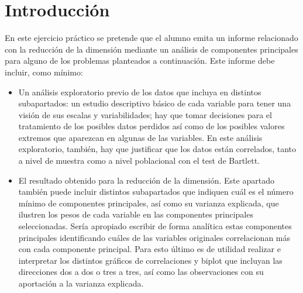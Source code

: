 \documentclass[12pt,twoside]{report}
\date{Curso 2020-2021}
\begin{document}



\clearpage{\pagestyle{empty}\cleardoublepage}
\setcounter{page}{1}
\pagestyle{fancy}



\begingroup
\pagestyle{plain}
\tableofcontents 
\endgroup

\clearpage{\pagestyle{empty}\cleardoublepage}
\setcounter{page}{1}
\fancyhead[LE,RO]{\slshape \rightmark}
\fancyhead[LO,RE]{\slshape \leftmark}

\chapter*{Introducción}

En este ejercicio práctico se pretende que el alumno emita un informe relacionado con la reducción de la dimensión mediante un análisis de componentes principales para alguno de los problemas planteados a continuación. Este informe debe incluir, como mínimo:

\begin{itemize}
	\item Un análisis exploratorio previo de los datos que incluya en distintos subapartados: un estudio descriptivo básico de cada variable para tener una visión de sus escalas y variabilidades; hay que tomar decisiones para el tratamiento de los posibles datos perdidos así como de los posibles valores extremos que aparezcan en algunas de las variables. En este análisis exploratorio, también, hay que justificar que los datos están correlados, tanto a nivel de muestra como a nivel poblacional con el test de Bartlett.
	\item El resultado obtenido para la reducción de la dimensión. Este apartado también puede incluir distintos subapartados que indiquen cuál es el número mínimo de componentes principales, así como su varianza explicada, que ilustren los pesos de cada variable en las componentes principales seleccionadas. Sería apropiado escribir de forma analítica estas componentes principales identificando cuáles de las variables originales correlacionan más con cada componente principal. Para esto último es de utilidad realizar e interpretar los distintos gráficos de correlaciones y biplot que incluyan las direcciones dos a dos o tres a tres, así como las observaciones con su aportación a la varianza explicada.
\end{itemize}
\end{document}

